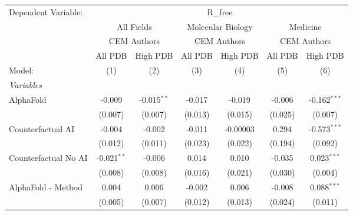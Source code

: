 \begingroup
\centering
\begin{tabular}{lcccccc}
   \tabularnewline \midrule \midrule
   Dependent Variable: & \multicolumn{6}{c}{R\_free}\\
 & \multicolumn{2}{c}{All Fields} & \multicolumn{2}{c}{Molecular Biology} & \multicolumn{2}{c}{Medicine} \\
\cmidrule(lr){2-3} \cmidrule(lr){4-5} \cmidrule(lr){6-7}
 & \multicolumn{2}{c}{CEM Authors} & \multicolumn{2}{c}{CEM Authors} & \multicolumn{2}{c}{CEM Authors} \\
\cmidrule(lr){2-3} \cmidrule(lr){4-5} \cmidrule(lr){6-7}
 & \multicolumn{1}{c}{All PDB} & \multicolumn{1}{c}{High PDB} & \multicolumn{1}{c}{All PDB} & \multicolumn{1}{c}{High PDB} & \multicolumn{1}{c}{All PDB} & \multicolumn{1}{c}{High PDB} \\
\cmidrule(lr){2-2} \cmidrule(lr){3-3} \cmidrule(lr){4-4} \cmidrule(lr){5-5} \cmidrule(lr){6-6} \cmidrule(lr){7-7}
   Model:                                                     & (1)           & (2)           & (3)       & (4)      & (5)     & (6)\\  
   \midrule
   \emph{Variables}\\
   AlphaFold                                                  & -0.009        & -0.015$^{**}$ & -0.017    & -0.019   & -0.006  & -0.162$^{***}$\\   
                                                              & (0.007)       & (0.007)       & (0.013)   & (0.015)  & (0.025) & (0.007)\\   
   Counterfactual AI                                          & -0.004        & -0.002        & -0.011    & -0.00003 & 0.294   & -0.573$^{***}$\\   
                                                              & (0.012)       & (0.011)       & (0.023)   & (0.022)  & (0.194) & (0.092)\\   
   Counterfactual No AI                                       & -0.021$^{**}$ & -0.006        & 0.014     & 0.010    & -0.035  & 0.023$^{***}$\\   
                                                              & (0.008)       & (0.008)       & (0.016)   & (0.021)  & (0.030) & (0.004)\\   
   AlphaFold - Method                                         & 0.004         & 0.006         & -0.002    & 0.006    & -0.008  & 0.088$^{***}$\\   
                                                              & (0.005)       & (0.007)       & (0.012)   & (0.013)  & (0.024) & (0.011)\\   

\end{tabular}
